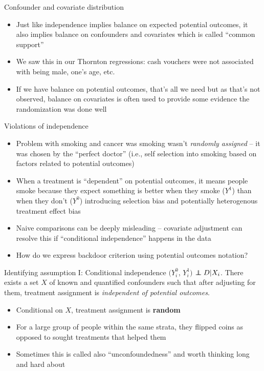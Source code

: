 \documentclass{beamer}
\newcommand\independent{\protect\mathpalette{\protect\independenT}{\perp}}
\def\independenT#1#2{\mathrel{\rlap{$#1#2$}\mkern2mu{#1#2}}}
\begin{document}
\begin{frame}{Confounder and covariate distribution}

\begin{itemize}
\item Just like independence implies balance on expected potential outcomes, it also implies balance on confounders and covariates which is called ``common support''
\item We saw this in our Thornton regressions: cash vouchers were not associated with being male, one's age, etc.
\item If we have balance on potential outcomes, that's all we need but as that's not observed, balance on covariates is often used to provide some evidence the randomization was done well
\end{itemize}
\end{frame}

\begin{frame}{Violations of independence}

\begin{itemize}
\item Problem with smoking and cancer was smoking wasn't \emph{randomly assigned} -- it was chosen by the ``perfect doctor'' (i.e., self selection into smoking based on factors related to potential outcomes)
\item When a treatment is ``dependent'' on potential outcomes, it means people smoke because they expect something is better when they smoke ($Y^1$) than when they don't ($Y^0$) introducing selection bias and potentially heterogenous treatment effect bias
\item Naive comparisons can be deeply misleading -- covariate adjustment can resolve this if ``conditional independence'' happens in the data
\item How do we express backdoor criterion using potential outcomes notation?
\end{itemize}

\end{frame}



\begin{frame}[plain]

	\begin{block}{Identifying assumption I: Conditional independence}
	$(Y_i^0$, $Y_i^1)$ $\independent{D} | X_i$. There exists a set $X$ of known and quantified confounders such that after adjusting for them, treatment assignment is \emph{independent of potential outcomes}.
	\end{block}
	
	\begin{itemize}
	\item Conditional on $X$, treatment assignment is \textbf{random}
	\item For a large group of people within the same strata, they flipped coins as opposed to sought treatments that helped them
	\item Sometimes this is called also ``unconfoundedness'' and worth thinking long and hard about
	\end{itemize}
\end{frame}
\end{document}
